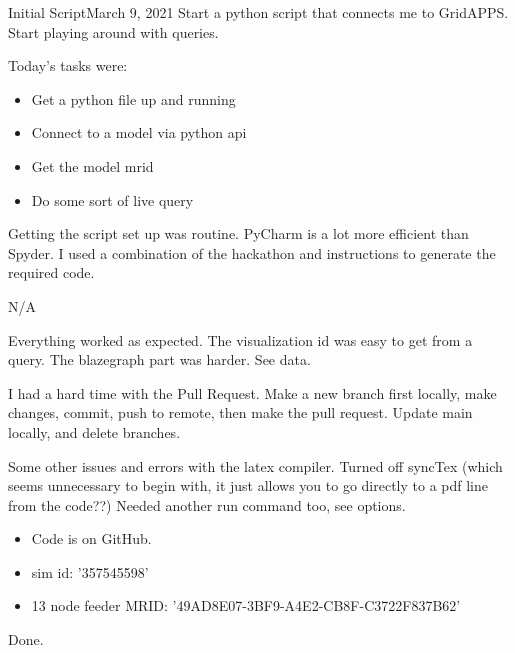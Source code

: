 
\begin{entry}{Initial Script}{March 9, 2021}
    \objective
    Start a python script that connects me to GridAPPS. Start playing around with queries.

    \outline

    Today's tasks were:
        \begin{itemize}
            \item Get a python file up and running
            \item Connect to a model via python api
            \item Get the model mrid
            \item Do some sort of live query
        \end{itemize}

    \procedures

        Getting the script set up was routine. PyCharm is a lot more efficient than Spyder.
        I used a combination of the hackathon and instructions to generate the required code.

    \parameters

    N/A

    \observations

        Everything worked as expected. The visualization id was easy to get from a query. The
        blazegraph part was harder. See data.

        I had a hard time with the Pull Request. Make a new branch first locally, make changes, commit, push to remote,
        then make the pull request. Update main locally, and delete branches.

        Some other issues and errors with the latex compiler. Turned off syncTex (which seems unnecessary to begin with,
        it just allows you to go directly to a pdf line from the code??) Needed another run command too, see options.

    \data
    \begin{itemize}
        \item Code is on GitHub.
        \item sim id: '357545598'
        \item 13 node feeder MRID: '\textunderscore49AD8E07-3BF9-A4E2-CB8F-C3722F837B62'
    \end{itemize}




    \results

    Done.

\end{entry}